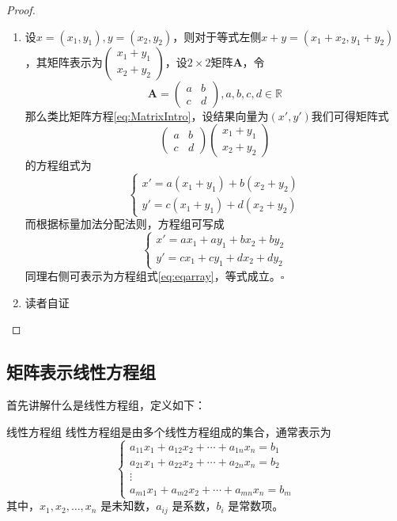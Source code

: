 \begin{proof}
	\begin{enumerate}
		\item 设$x=(x_1,y_1),y=(x_2,y_2)$，则对于等式左侧$x+y=(x_1+x_2,y_1+y_2)$，其矩阵表示为$\begin{pmatrix}  
			x_1+y_1 \\  
			x_2+y_2  
		  \end{pmatrix} $，设$2\times 2$矩阵$\mathbf{A}$，令$$\mathbf{A}=\begin{pmatrix}  
			a & b \\  
			c & d  
		  \end{pmatrix} ,a,b,c,d \in \mathbb{R}$$那么类比矩阵方程\ref{eq:MatrixIntro}，设结果向量为$(x',y')$我们可得矩阵式$$\begin{pmatrix}  
			a & b \\  
			c & d  
		  \end{pmatrix} \begin{pmatrix}  
			x_1+y_1 \\  
			x_2+y_2  
		  \end{pmatrix} $$的方程组式为$$\left\{\begin{matrix} 
			x'=a(x_1+y_1)+b(x_2+y_2) \\  
			y'=c(x_1+y_1)+d(x_2+y_2)
		  \end{matrix}\right. $$而根据标量加法分配法则，方程组可写成\begin{equation}\left\{\begin{matrix} 
			x'=ax_1+ay_1+bx_2+by_2 \\  
			y'=cx_1+cy_1+dx_2+dy_2
		  \end{matrix}\right. \label{eq:eqarray}\end{equation}同理右侧可表示为方程组式\ref{eq:eqarray}，等式成立。$\square$
		\item 读者自证
	\end{enumerate}
\end{proof}

\subsection{矩阵表示线性方程组}

首先讲解什么是线性方程组，定义如下：

\begin{definition}{线性方程组}
	线性方程组是由多个线性方程组成的集合，通常表示为$$\begin{cases}
		a_{11}x_1 + a_{12}x_2 + \cdots + a_{1n}x_n = b_1 \\
		a_{21}x_1 + a_{22}x_2 + \cdots + a_{2n}x_n = b_2 \\
		\vdots \\
		a_{m1}x_1 + a_{m2}x_2 + \cdots + a_{mn}x_n = b_m
		\end{cases}$$
		其中，$ x_1, x_2, \ldots, x_n $ 是未知数，$ a_{ij} $ 是系数，$ b_i $ 是常数项。
\end{definition}


